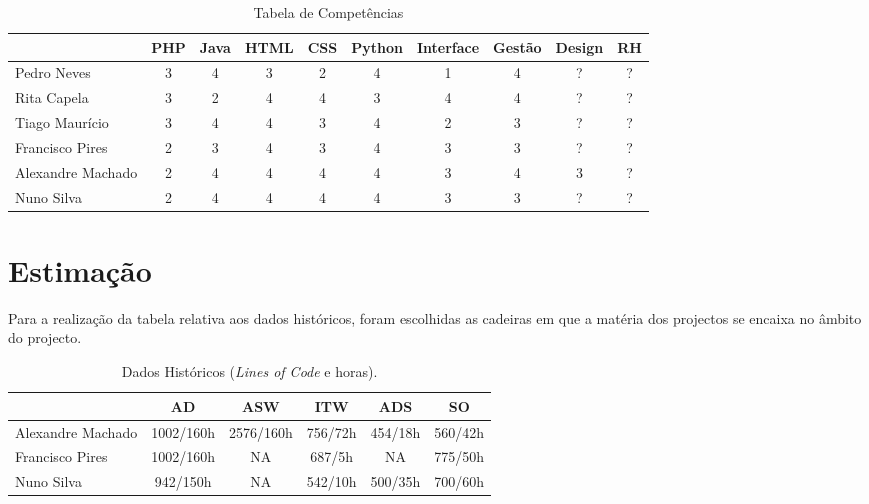 \documentclass[12pt, a4paper, twoside]{report} %
\begin{document}
\begin{table}[h]
\centering
\begin{tabular}{|l|c c c c c c c c c|}
\hline
				  & PHP & Java & HTML & CSS & Python & Interface & Gestão  & Design & RH\\ \hline
Pedro Neves       & 3   & 4    & 3    & 2   & 4      & 1         & 4       & ?      & ?     \\ \hline
Rita Capela       & 3   & 2    & 4    & 4   & 3      & 4         & 4       & ?      & ?     \\ \hline
Tiago Maurício    & 3   & 4    & 4    & 3   & 4      & 2         & 3       & ?      & ?     \\ \hline
Francisco Pires   & 2   & 3    & 4    & 3   & 4      & 3         & 3       & ?      & ?     \\ \hline
Alexandre Machado & 2   & 4    & 4    & 4   & 4      & 3         & 4       & 3      & ?     \\ \hline
Nuno Silva        & 2   & 4    & 4    & 4   & 4      & 3         & 3       & ?      & ?     \\ \hline
\end{tabular}
\caption{Tabela de Competências}
\label{competencias}
\end{table}

\clearpage


\section{Estimação}

Para a realização da tabela relativa aos dados históricos, foram escolhidas as cadeiras em que a matéria dos projectos se encaixa no âmbito do projecto.

\begin{table}[h]
\centering
\begin{tabular}{|l|c c c c c|}
\hline
				  & AD        & ASW       & ITW     & ADS     & SO      \\ \hline
Alexandre Machado & 1002/160h & 2576/160h & 756/72h & 454/18h & 560/42h \\ \hline
Francisco Pires   & 1002/160h & NA        & 687/5h  & NA      & 775/50h \\ \hline
Nuno Silva        & 942/150h  & NA        & 542/10h & 500/35h & 700/60h\\ \hline
\end{tabular}
\caption{ Dados Históricos (\textit{Lines of Code} e horas).}
\label{my-label}
\end{table}
\end{document}
